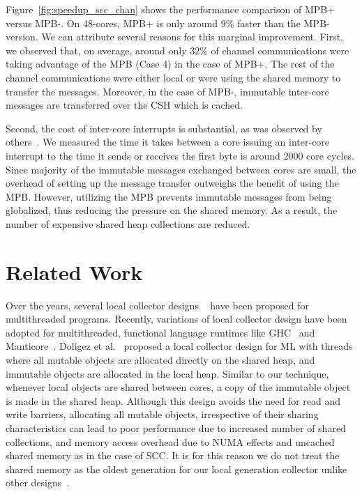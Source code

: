 Figure~\ref{fig:speedup_scc_chan} shows the performance comparison of MPB+
versus MPB-. On 48-cores, MPB+ is only around 9\% faster than the MPB- version.
We can attribute several reasons for this marginal improvement. First, we
observed that, on average, around only 32\% of channel communications were
taking advantage of the MPB (Case 4) in the case of MPB+. The rest of the
channel communications were either local or were using the shared memory to
transfer the messages. Moreover, in the case of MPB-, immutable inter-core
messages are transferred over the CSH which is cached.

Second, the cost of inter-core interrupts is substantial, as was observed by
others~\cite{Peter11,Darko11}. We measured the time it takes between a core
issuing an inter-core interrupt to the time it sends or receives the first byte
is around 2000 core cycles. Since majority of the immutable messages exchanged
between cores are small, the overhead of setting up the message transfer
outweighs the benefit of using the MPB. However, utilizing the MPB prevents
immutable messages from being globalized, thus reducing the pressure on the
shared memory. As a result, the number of expensive shared heap collections are
reduced.

\section{Related Work}

Over the years, several local collector designs ~\cite{Steele75, Doligez93,
Steensgaard00, Anderson10} have been proposed for multithreaded programs.
Recently, variations of local collector design have been adopted for
multithreaded, functional language runtimes like GHC~\cite{Marlow11} and
Manticore~\cite{Auhagen11}. Doligez et al.~\cite{Doligez93} proposed a local
collector design for ML with threads where all mutable objects are allocated
directly on the shared heap, and immutable objects are allocated in the local
heap. Similar to our technique, whenever local objects are shared between
cores, a copy of the immutable object is made in the shared heap. Although this
design avoids the need for read and write barriers, allocating all mutable
objects, irrespective of their sharing characteristics can lead to poor
performance due to increased number of shared collections, and memory access
overhead due to NUMA effects and uncached shared memory as in the case of SCC.
It is for this reason we do not treat the shared memory as the oldest
generation for our local generation collector unlike other
designs~\cite{Doligez93, Marlow11}.

